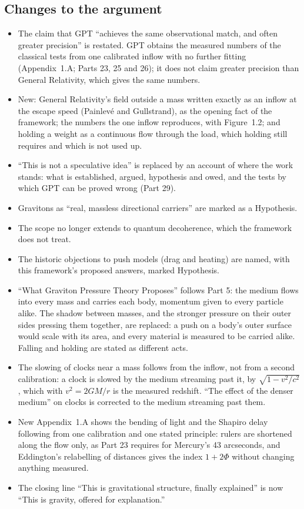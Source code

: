 \subsection*{Changes to the argument}
\begin{itemize}
  \item The claim that GPT ``achieves the same observational match, and often greater precision'' is restated. GPT obtains the measured numbers of the classical tests from one calibrated inflow with no further fitting (Appendix~1.A; Parts 23, 25 and 26); it does not claim greater precision than General Relativity, which gives the same numbers.
  \item New: General Relativity's field outside a mass written exactly as an inflow at the escape speed (Painlevé and Gullstrand), as the opening fact of the framework; the numbers the one inflow reproduces, with Figure~1.2; and holding a weight as a continuous flow through the load, which holding still requires and which is not used up.
  \item ``This is not a speculative idea'' is replaced by an account of where the work stands: what is established, argued, hypothesis and owed, and the tests by which GPT can be proved wrong (Part 29).
  \item Gravitons as ``real, massless directional carriers'' are marked as a Hypothesis.
  \item The scope no longer extends to quantum decoherence, which the framework does not treat.
  \item The historic objections to push models (drag and heating) are named, with this framework's proposed answers, marked Hypothesis.
  \item ``What Graviton Pressure Theory Proposes'' follows Part 5: the medium flows into every mass and carries each body, momentum given to every particle alike. The shadow between masses, and the stronger pressure on their outer sides pressing them together, are replaced: a push on a body's outer surface would scale with its area, and every material is measured to be carried alike. Falling and holding are stated as different acts.
  \item The slowing of clocks near a mass follows from the inflow, not from a second calibration: a clock is slowed by the medium streaming past it, by $\sqrt{1-v^2/c^2}$, which with $v^2=2GM/r$ is the measured redshift. ``The effect of the denser medium'' on clocks is corrected to the medium streaming past them.
  \item New Appendix~1.A shows the bending of light and the Shapiro delay following from one calibration and one stated principle: rulers are shortened along the flow only, as Part 23 requires for Mercury's 43 arcseconds, and Eddington's relabelling of distances gives the index $1+2\Phi$ without changing anything measured.
  \item The closing line ``This is gravitational structure, finally explained'' is now ``This is gravity, offered for explanation.''
\end{itemize}

